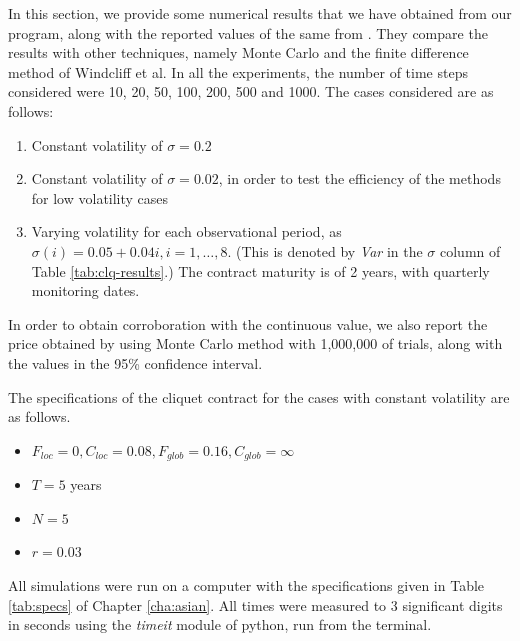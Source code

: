In this section, we provide some numerical results that we have obtained from our program, along with the reported values of the same from \cite[Section 4]{Gaudenzi2011}. They compare the results with other techniques, namely Monte Carlo and the finite difference method of Windcliff et al\cite{Windcliff2006}. In all the experiments, the number of time steps considered were 10, 20, 50, 100, 200, 500 and 1000. The cases considered are as follows:
\begin{enumerate}
	\item Constant volatility of $ \sigma = 0.2 $
	\item Constant volatility of $ \sigma = 0.02 $, in order to test the efficiency of the methods for low volatility cases
	\item Varying volatility for each observational period, as $ \sigma(i) = 0.05 + 0.04i, i = 1, \dots, 8 $. (This is denoted by \emph{Var} in the $ \sigma $ column of Table \ref{tab:clq-results}.) The contract maturity is of 2 years, with quarterly monitoring dates.
\end{enumerate}
In order to obtain corroboration with the continuous value, we also report the price obtained by using Monte Carlo method with 1,000,000 of trials, along with the values in the 95\% confidence interval.

The specifications of the cliquet contract for the cases with constant volatility are as follows.
\begin{itemize}
	\item $ F_{loc} = 0, C_{loc} = 0.08, F_{glob} = 0.16, C_{glob} = \infty $
	\item $ T = 5 $ years
	\item $ N = 5 $
	\item $ r = 0.03 $
\end{itemize}

All simulations were run on a computer with the specifications given in Table \ref{tab:specs} of Chapter \ref{cha:asian}. All times were measured to 3 significant digits in seconds using the \emph{timeit} module of python, run from the terminal.

